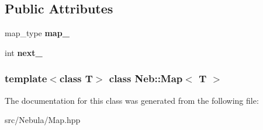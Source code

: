 \subsection*{\-Public \-Attributes}
\begin{DoxyCompactItemize}
\item 
\hypertarget{classNeb_1_1Map_a90e63f3ea00d82d366192f092cdb5fa9}{map\-\_\-type {\bfseries map\-\_\-}}\label{classNeb_1_1Map_a90e63f3ea00d82d366192f092cdb5fa9}

\item 
\hypertarget{classNeb_1_1Map_a8b62fd79e9fc42a74a72f22c21a932ba}{int {\bfseries next\-\_\-}}\label{classNeb_1_1Map_a8b62fd79e9fc42a74a72f22c21a932ba}

\end{DoxyCompactItemize}
\subsubsection*{template$<$class \-T$>$ class Neb\-::\-Map$<$ T $>$}



\-The documentation for this class was generated from the following file\-:\begin{DoxyCompactItemize}
\item 
src/\-Nebula/\-Map.\-hpp\end{DoxyCompactItemize}
